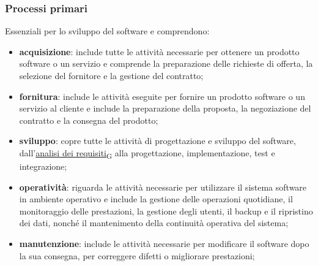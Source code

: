 \subsubsection{Processi primari}
Essenziali per lo sviluppo del software e comprendono:
\begin{itemize}
    \item \textbf{acquisizione}: include tutte le attività necessarie per ottenere un prodotto software o un servizio e comprende la preparazione delle richieste di offerta, la selezione del fornitore e la gestione del contratto;
    \item \textbf{fornitura}: include le attività eseguite per fornire un prodotto software o un servizio al cliente e include la preparazione della proposta, la negoziazione del contratto e la consegna del prodotto;
    \item \textbf{sviluppo}: copre tutte le attività di progettazione e sviluppo del software, dall'\href{https://7last.github.io/docs/pb/documentazione-interna/glossario\#analisi-dei-requisiti}{analisi dei requisiti\textsubscript{G}} alla progettazione, implementazione, test e integrazione;
    \item \textbf{operatività}: riguarda le attività necessarie per utilizzare il sistema software in ambiente operativo e include la gestione delle operazioni quotidiane, il monitoraggio delle prestazioni, la gestione degli utenti, il backup e il ripristino dei dati, nonché il mantenimento della continuità operativa del sistema;
    \item \textbf{manutenzione}: include le attività necessarie per modificare il software dopo la sua consegna, per correggere difetti o migliorare prestazioni;
\end{itemize}
